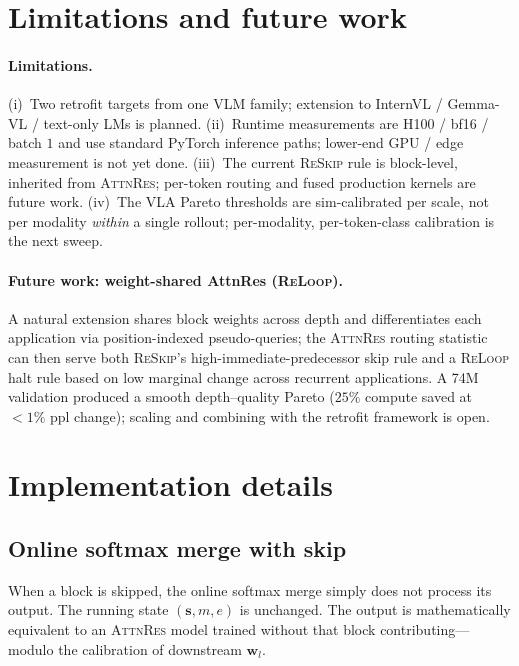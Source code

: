 \documentclass{article}
\newcommand{\attnres}{\textsc{AttnRes}}
\newcommand{\reskip}{\textsc{ReSkip}}
\newcommand{\reloop}{\textsc{ReLoop}}
\begin{document}


\appendix
\section{Limitations and future work}
\label{app:limitations}

\paragraph{Limitations.}
(i)~Two retrofit targets from one VLM family; extension to InternVL / Gemma-VL / text-only LMs is planned. (ii)~Runtime measurements are H100 / bf16 / batch $1$ and use standard PyTorch inference paths; lower-end GPU / edge measurement is not yet done. (iii)~The current \reskip{} rule is block-level, inherited from \attnres{}; per-token routing and fused production kernels are future work. (iv)~The VLA Pareto thresholds are sim-calibrated per scale, not per modality \emph{within} a single rollout; per-modality, per-token-class calibration is the next sweep.

\paragraph{Future work: weight-shared AttnRes (\reloop{}).}
A natural extension shares block weights across depth and differentiates each application via position-indexed pseudo-queries; the \attnres{} routing statistic can then serve both \reskip{}'s high-immediate-predecessor skip rule and a \reloop{} halt rule based on low marginal change across recurrent applications. A 74M validation produced a smooth depth--quality Pareto ($25\%$ compute saved at $<1\%$ ppl change); scaling and combining with the retrofit framework is open.

\section{Implementation details}
\label{app:implementation}

\subsection{Online softmax merge with skip}
When a block is skipped, the online softmax merge simply does not process its output. The running state $(\mathbf{s}, m, e)$ is unchanged. The output is mathematically equivalent to an \attnres{} model trained without that block contributing---modulo the calibration of downstream $\mathbf{w}_l$.
\end{document}
